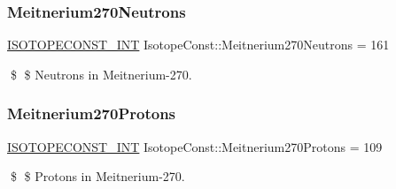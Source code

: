 \subsubsection{\texorpdfstring{Meitnerium270\+Neutrons}{Meitnerium270Neutrons}}
{\footnotesize\ttfamily \mbox{\hyperlink{group___isotope_const-_macros_ga5f18360b3e99483a35c32d789e62621c}{I\+S\+O\+T\+O\+P\+E\+C\+O\+N\+S\+T\+\_\+\+I\+NT}} Isotope\+Const\+::\+Meitnerium270\+Neutrons = 161}

\$ \$ Neutrons in Meitnerium-\/270. \mbox{\label{group___isotope_const-_meitnerium-_mt270_gad1546a40495d0a67e01c106671cd1610}} 
\subsubsection{\texorpdfstring{Meitnerium270\+Protons}{Meitnerium270Protons}}
{\footnotesize\ttfamily \mbox{\hyperlink{group___isotope_const-_macros_ga5f18360b3e99483a35c32d789e62621c}{I\+S\+O\+T\+O\+P\+E\+C\+O\+N\+S\+T\+\_\+\+I\+NT}} Isotope\+Const\+::\+Meitnerium270\+Protons = 109}

\$ \$ Protons in Meitnerium-\/270. 